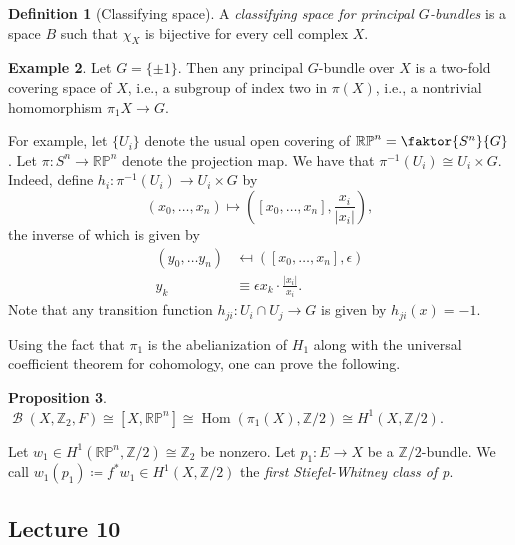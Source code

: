 \documentclass[10pt,letterpaper,cm]{nupset}
\theoremstyle{definition}
\newtheorem{defn}{Definition}[subsection]
\newtheorem{exmp}[defn]{Example}
\theoremstyle{theorem}
\newtheorem{prop}[defn]{Proposition}
\theoremstyle{remark}
\newcommand{\RP}{\mathbb{RP}}
\newcommand{\Z}{\mathbb Z}
\newcommand{\1}{\mathbb{1}}
\newcommand{\0}{\vec 0}
\DeclareMathOperator{\Hom}{Hom}
\DeclareMathOperator{\B}{\mathcal{B}}
\begin{document}
\begin{defn}[Classifying space]
  A \textit{classifying space for principal $G$-bundles} is a space $B$ such that $\chi_X$ is bijective for every cell complex $X$.
\end{defn}

\begin{exmp}
Let $G = \{\pm 1\}$.  Then any principal $G$-bundle over $X$ is a two-fold covering space of $X$, i.e., a subgroup of index two in $\pi\left(X\right)$, i.e., a nontrivial homomorphism $\pi_1{X} \to G$.

\smallskip

 For example, let $\{U_i\}$ denote the usual open covering of $\RP^n = \faktor{S^n}{G}$. Let $\pi : S^n \to \RP^n$ denote the projection map. We have that $\pi^{-1} \left(U_i\right) \cong U_i \times G$. Indeed,  define $h_i : \pi^{-1} \left(U_i\right) \to  U_i \times G$ by $$\left(x_0, \ldots, x_n\right) \mapsto \left(\left[x_0, \ldots, x_n\right], \frac{x_i}{\lvert{x_i}\rvert}\right),$$ the inverse of which is  given by 
 \begin{align*}
 \left(y_0, \ldots y_n\right) & \mapsfrom \left(\left[x_0, \ldots, x_n\right], \epsilon \right) 
 \\ y_k & \equiv \epsilon x_k\cdot \frac{\lvert{x_i}\rvert}{x_i}.
 \end{align*}
 Note that any transition function $h_{ji} : U_i \cap U_j \to G$ is given by $h_{ji}(x) = {-}1$.
\end{exmp}

Using the fact that $\pi_1$ is the abelianization of $H_1$ along with the universal coefficient theorem for cohomology, one can prove the following.

\begin{prop}
$\B\left(X, \Z_2, F \right) \cong \left[X, \RP^n\right] \cong \Hom\left(\pi_1\left(X\right), \Z/2\right) \cong H^1\left(X, \Z/2\right)$. 
\end{prop}

Let $w_1 \in H^1\left(\RP^n, \Z/2\right) \cong \Z_2$ be nonzero. Let $p_1 : E \to X$ be a $\Z/2$-bundle. We call $w_1\left(p_1\right) \coloneqq f^{\ast}{w_1} \in H^1\left(X, \Z/2\right)$ the \textit{first Stiefel-Whitney class of p}. 

\subsection{Lecture 10}
\end{document}

